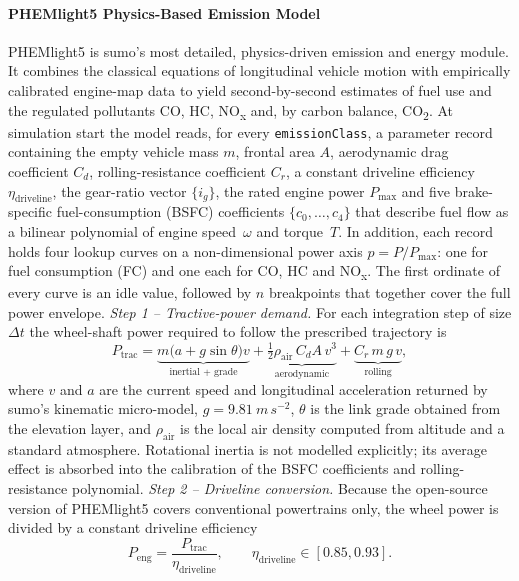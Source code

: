 \paragraph{PHEMlight5 Physics-Based Emission Model}  
PHEMlight5 is \ac{sumo}’s \cite{Krajzewicz2002} most detailed, physics-driven emission and energy module. It combines the classical equations of longitudinal vehicle motion with empirically calibrated engine-map data to yield second-by-second estimates of fuel use and the regulated pollutants CO, HC, NO\textsubscript{x} and, by carbon balance, CO\textsubscript{2}. At simulation start the model reads, for every \lstinline{emissionClass}, a parameter record containing the empty vehicle mass $m$, frontal area $A$, aerodynamic drag coefficient $C_{d}$, rolling-resistance coefficient $C_{r}$, a constant driveline efficiency $\eta_{\mathrm{driveline}}$, the gear-ratio vector $\{i_{g}\}$, the rated engine power $P_{\max}$ and five brake-specific fuel-consumption (BSFC) coefficients $\{c_{0},\dots,c_{4}\}$ that describe fuel flow as a bilinear polynomial of engine speed~$\omega$ and torque~$T$. In addition, each record holds four lookup curves on a non-dimensional power axis $p=P/P_{\max}$: one for fuel consumption (FC) and one each for CO, HC and NO\textsubscript{x}. The first ordinate of every curve is an idle value, followed by $n$ breakpoints that together cover the full power envelope.
\mynewline
\textit{Step 1 – Tractive-power demand.}  
For each integration step of size $\Delta t$ the wheel-shaft power required to follow the prescribed trajectory is
\[
  \boxed{P_{\mathrm{trac}}=
      \underbrace{m\bigl(a+g\sin\theta\bigr)v}_{\text{inertial + grade}}
      +\underbrace{\tfrac12\rho_{\mathrm{air}}\,C_{d}A\,v^{3}}_{\text{aerodynamic}}
      +\underbrace{C_{r}\,m\,g\,v}_{\text{rolling}}},
\]
where $v$ and $a$ are the current speed and longitudinal acceleration returned by \ac{sumo}’s kinematic micro-model, $g=\SI{9.81}{m\,s^{-2}}$, $\theta$ is the link grade obtained from the elevation layer, and $\rho_{\mathrm{air}}$ is the local air density computed from altitude and a standard atmosphere.  Rotational inertia is not modelled explicitly; its average effect is absorbed into the calibration of the BSFC coefficients and rolling-resistance polynomial.
\mynewline
\textit{Step 2 – Driveline conversion.}  
Because the open-source version of PHEMlight5 covers conventional powertrains only, the wheel power is divided by a constant driveline efficiency
\[
  P_{\mathrm{eng}}=\frac{P_{\mathrm{trac}}}{\eta_{\mathrm{driveline}}},\qquad
  \eta_{\mathrm{driveline}}\in[0.85,0.93].
\]
